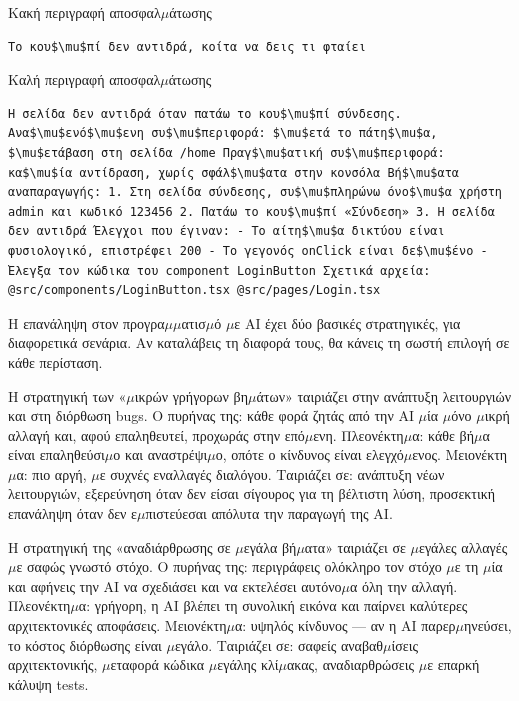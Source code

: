 Κακή περιγραφή αποσφαλ$\mu$άτωσης

\begin{lstlisting}
Το κου$\mu$πί δεν αντιδρά, κοίτα να δεις τι φταίει
\end{lstlisting}

Καλή περιγραφή αποσφαλ$\mu$άτωσης

\begin{lstlisting}
Η σελίδα δεν αντιδρά όταν πατάω το κου$\mu$πί σύνδεσης. Ανα$\mu$ενό$\mu$ενη συ$\mu$περιφορά: $\mu$ετά το πάτη$\mu$α, $\mu$ετάβαση στη σελίδα /home Πραγ$\mu$ατική συ$\mu$περιφορά: κα$\mu$ία αντίδραση, χωρίς σφάλ$\mu$ατα στην κονσόλα Βή$\mu$ατα αναπαραγωγής: 1. Στη σελίδα σύνδεσης, συ$\mu$πληρώνω όνο$\mu$α χρήστη admin και κωδικό 123456 2. Πατάω το κου$\mu$πί «Σύνδεση» 3. Η σελίδα δεν αντιδρά Έλεγχοι που έγιναν: - Το αίτη$\mu$α δικτύου είναι φυσιολογικό, επιστρέφει 200 - Το γεγονός onClick είναι δε$\mu$ένο - Έλεγξα τον κώδικα του component LoginButton Σχετικά αρχεία: @src/components/LoginButton.tsx @src/pages/Login.tsx
\end{lstlisting}


Η επανάληψη στον προγρα$\mu$$\mu$ατισ$\mu$ό $\mu$ε AI έχει δύο βασικές στρατηγικές, για διαφορετικά σενάρια. Αν καταλάβεις τη διαφορά τους, θα κάνεις τη σωστή επιλογή σε κάθε περίσταση.

Η στρατηγική των «$\mu$ικρών γρήγορων βη$\mu$άτων» ταιριάζει στην ανάπτυξη λειτουργιών και στη διόρθωση bugs. Ο πυρήνας της: κάθε φορά ζητάς από την AI $\mu$ία $\mu$όνο $\mu$ικρή αλλαγή και, αφού επαληθευτεί, προχωράς στην επό$\mu$ενη. Πλεονέκτη$\mu$α: κάθε βή$\mu$α είναι επαληθεύσι$\mu$ο και αναστρέψι$\mu$ο, οπότε ο κίνδυνος είναι ελεγχό$\mu$ενος. Μειονέκτη$\mu$α: πιο αργή, $\mu$ε συχνές εναλλαγές διαλόγου. Ταιριάζει σε: ανάπτυξη νέων λειτουργιών, εξερεύνηση όταν δεν είσαι σίγουρος για τη βέλτιστη λύση, προσεκτική επανάληψη όταν δεν ε$\mu$πιστεύεσαι απόλυτα την παραγωγή της AI.

Η στρατηγική της «αναδιάρθρωσης σε $\mu$εγάλα βή$\mu$ατα» ταιριάζει σε $\mu$εγάλες αλλαγές $\mu$ε σαφώς γνωστό στόχο. Ο πυρήνας της: περιγράφεις ολόκληρο τον στόχο $\mu$ε τη $\mu$ία και αφήνεις την AI να σχεδιάσει και να εκτελέσει αυτόνο$\mu$α όλη την αλλαγή. Πλεονέκτη$\mu$α: γρήγορη, η AI βλέπει τη συνολική εικόνα και παίρνει καλύτερες αρχιτεκτονικές αποφάσεις. Μειονέκτη$\mu$α: υψηλός κίνδυνος — αν η AI παρερ$\mu$ηνεύσει, το κόστος διόρθωσης είναι $\mu$εγάλο. Ταιριάζει σε: σαφείς αναβαθ$\mu$ίσεις αρχιτεκτονικής, $\mu$εταφορά κώδικα $\mu$εγάλης κλί$\mu$ακας, αναδιαρθρώσεις $\mu$ε επαρκή κάλυψη tests.

